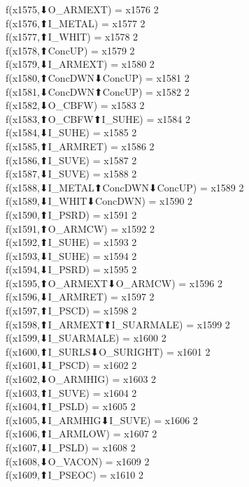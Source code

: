 f(x1575,⬇O_ARMEXT) = x1576 {2} \\
f(x1576,⬆I_METAL) = x1577 {2} \\
f(x1577,⬆I_WHIT) = x1578 {2} \\
f(x1578,⬆ConcUP) = x1579 {2} \\
f(x1579,⬇I_ARMEXT) = x1580 {2} \\
f(x1580,⬆ConcDWN⬇ConcUP) = x1581 {2} \\
f(x1581,⬇ConcDWN⬆ConcUP) = x1582 {2} \\
f(x1582,⬇O_CBFW) = x1583 {2} \\
f(x1583,⬆O_CBFW⬆I_SUHE) = x1584 {2} \\
f(x1584,⬇I_SUHE) = x1585 {2} \\
f(x1585,⬆I_ARMRET) = x1586 {2} \\
f(x1586,⬆I_SUVE) = x1587 {2} \\
f(x1587,⬇I_SUVE) = x1588 {2} \\
f(x1588,⬇I_METAL⬆ConcDWN⬇ConcUP) = x1589 {2} \\
f(x1589,⬇I_WHIT⬇ConcDWN) = x1590 {2} \\
f(x1590,⬆I_PSRD) = x1591 {2} \\
f(x1591,⬆O_ARMCW) = x1592 {2} \\
f(x1592,⬆I_SUHE) = x1593 {2} \\
f(x1593,⬇I_SUHE) = x1594 {2} \\
f(x1594,⬇I_PSRD) = x1595 {2} \\
f(x1595,⬆O_ARMEXT⬇O_ARMCW) = x1596 {2} \\
f(x1596,⬇I_ARMRET) = x1597 {2} \\
f(x1597,⬆I_PSCD) = x1598 {2} \\
f(x1598,⬆I_ARMEXT⬆I_SUARMALE) = x1599 {2} \\
f(x1599,⬇I_SUARMALE) = x1600 {2} \\
f(x1600,⬆I_SURLS⬇O_SURIGHT) = x1601 {2} \\
f(x1601,⬇I_PSCD) = x1602 {2} \\
f(x1602,⬇O_ARMHIG) = x1603 {2} \\
f(x1603,⬆I_SUVE) = x1604 {2} \\
f(x1604,⬆I_PSLD) = x1605 {2} \\
f(x1605,⬇I_ARMHIG⬇I_SUVE) = x1606 {2} \\
f(x1606,⬆I_ARMLOW) = x1607 {2} \\
f(x1607,⬇I_PSLD) = x1608 {2} \\
f(x1608,⬇O_VACON) = x1609 {2} \\
f(x1609,⬆I_PSEOC) = x1610 {2} \\
